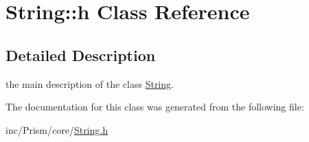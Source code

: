 \hypertarget{class_string_1_1h}{}\section{String\+:\+:h Class Reference}
\label{class_string_1_1h}


\subsection{Detailed Description}
the main description of the class \hyperlink{namespace_string}{String}. 

The documentation for this class was generated from the following file\+:\begin{DoxyCompactItemize}
\item 
inc/\+Prism/core/\hyperlink{_string_8h}{String.\+h}\end{DoxyCompactItemize}
